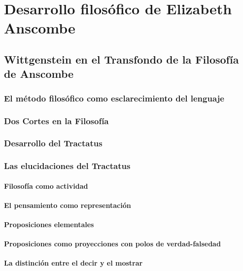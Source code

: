 \documentclass[./main.tex]{subfiles}
\begin{document}
\setcounter{chapter}{2}
\chapter{
Desarrollo filosófico de Elizabeth Anscombe
}

\section{Wittgenstein en el Transfondo de la Filosofía de Anscombe}

\subsection{El método filosófico como esclarecimiento del lenguaje}

\subsection{Dos Cortes en la Filosofía}

\subsection{Desarrollo del Tractatus}

\subsection{Las elucidaciones del Tractatus}

\subsubsection{Filosofía como actividad}

\subsubsection{El pensamiento como representación}

\subsubsection{Proposiciones elementales}

\subsubsection{Proposiciones como proyecciones con polos de verdad-falsedad}

\subsubsection{La distinción entre el decir y el mostrar}
\end{document}
